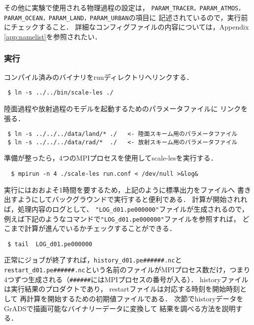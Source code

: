 その他に実験で使用される物理過程の設定は，
\verb|PARAM_TRACER，PARAM_ATMOS，PARAM_OCEAN，PARAM_LAND，PARAM_URBAN|の項目に
記述されているので，実行前にチェックすること．
詳細なコンフィグファイルの内容については，Appendix \ref{app:namelist}を参照されたい．

%
\subsubsection{実行}
コンパイル済みのバイナリをrunディレクトリへリンクする．

\begin{verbatim}
 $ ln -s ../../bin/scale-les ./
\end{verbatim}
陸面過程や放射過程のモデルを起動するためのパラメータファイルに
リンクを張る．
\begin{verbatim}
 $ ln -s ../../../data/land/* ./   <- 陸面スキーム用のパラメータファイル
 $ ln -s ../../../data/rad/*  ./   <- 放射スキーム用のパラメータファイル
\end{verbatim}
準備が整ったら，4つのMPIプロセスを使用してscale-lesを実行する．
\begin{verbatim}
  $ mpirun -n 4 ./scale-les run.conf < /dev/null >&log&
\end{verbatim}

実行にはおおよそ1時間を要するため，上記のように標準出力をファイルへ
書き出すようにしてバックグラウンドで実行すると便利である．
計算が開始されれば，処理内容のログとして、
\verb|"LOG_d01.pe000000"|ファイルが生成されるので，
例えば下記のようなコマンドで\verb|"LOG_d01.pe000000"|ファイルを参照すれば，
どこまで計算が進んでいるかチェックすることができる．
\begin{verbatim}
 $ tail  LOG_d01.pe000000
\end{verbatim}
正常にジョブが終了すれば，\verb|history_d01.pe######.nc|と
\verb|restart_d01.pe######.nc|という名前のファイルがMPIプロセス数だけ，つまり4つずつ生成される（\verb|######|にはMPIプロセスの番号が入る）．
historyファイルは実行結果のプロダクトであり，
restartファイルは対応する時刻を開始時刻として
再計算を開始するための初期値ファイルである．
次節でhistoryデータをGrADSで描画可能なバイナリーデータに変換して
結果を調べる方法を説明する．


